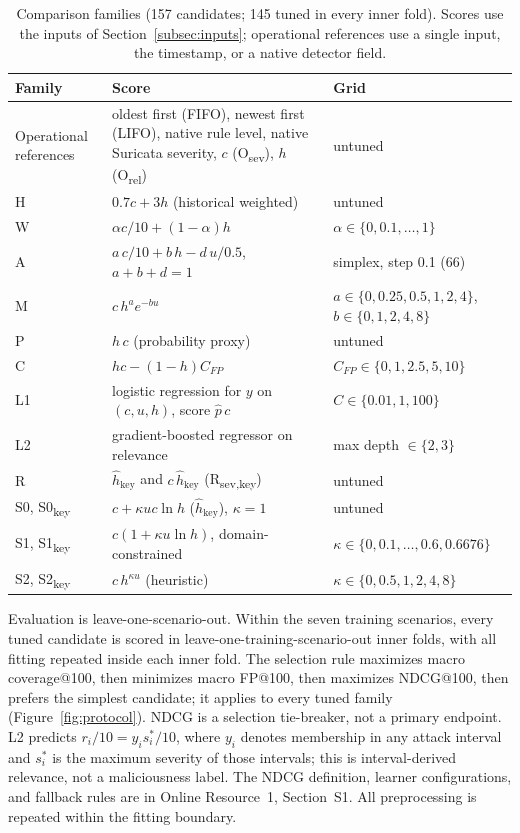\documentclass[pdflatex,sn-basic,Numbered]{sn-jnl}
\newcommand{\NCandidates}{157}
\newcommand{\NTuned}{145}
\newcommand{\key}{\textsubscript{key}}
\newcommand{\Rsev}{R\textsubscript{sev,key}}
\begin{document}
\begin{table}[t]
\caption{Comparison families (\NCandidates{} candidates; \NTuned{} tuned in every inner fold). Scores use the inputs of Section~\ref{subsec:inputs}; operational references use a single input, the timestamp, or a native detector field.}
\label{tab:families}
\small
\setlength{\tabcolsep}{4pt}
\begin{tabular}{>{\raggedright\arraybackslash}p{}>{\raggedright\arraybackslash}p{}>{\raggedright\arraybackslash}p{}}
\toprule
Family & Score & Grid \\
\midrule
Operational references & oldest first (FIFO), newest first (LIFO), native rule level, native Suricata severity, $c$ (O\textsubscript{sev}), $h$ (O\textsubscript{rel}) & untuned \\
H & $0.7c + 3h$ (historical weighted) & untuned \\
W & $\alpha c/10 + (1-\alpha) h$ & $\alpha \in \{0, 0.1, \dots, 1\}$ \\
A & $a\,c/10 + b\,h - d\,u/0.5$, $a+b+d=1$ & simplex, step 0.1 (66) \\
M & $c\,h^{a} e^{-bu}$ & $a \in \{0,0.25,0.5,1,2,4\}$, $b \in \{0,1,2,4,8\}$ \\
P & $h\,c$ (probability proxy) & untuned \\
C & $h c - (1-h) C_{FP}$ & $C_{FP} \in \{0,1,2.5,5,10\}$ \\
L1 & logistic regression for $y$ on $(c,u,h)$, score $\hat p\,c$ & $C \in \{0.01, 1, 100\}$ \\
L2 & gradient-boosted regressor on relevance & max depth $\in \{2,3\}$ \\
R & $\hat h_{\mathrm{key}}$ and $c\,\hat h_{\mathrm{key}}$ (\Rsev) & untuned \\
S0, S0\key & $c + \kappa u c \ln h$ ($\hat h_{\mathrm{key}}$), $\kappa = 1$ & untuned \\
S1, S1\key & $c(1 + \kappa u \ln h)$, domain-constrained & $\kappa \in \{0,0.1,\dots,0.6,0.6676\}$ \\
S2, S2\key & $c\,h^{\kappa u}$ (heuristic) & $\kappa \in \{0,0.5,1,2,4,8\}$ \\
\bottomrule
\end{tabular}
\end{table}

Evaluation is leave-one-scenario-out. Within the seven training scenarios, every tuned candidate is scored in leave-one-training-scenario-out inner folds, with all fitting repeated inside each inner fold. The selection rule maximizes macro coverage@100, then minimizes macro FP@100, then maximizes NDCG@100, then prefers the simplest candidate; it applies to every tuned family (Figure~\ref{fig:protocol}). NDCG is a selection tie-breaker, not a primary endpoint. L2 predicts $r_i/10=y_i s_i^*/10$, where $y_i$ denotes membership in any attack interval and $s_i^*$ is the maximum severity of those intervals; this is interval-derived relevance, not a maliciousness label. The NDCG definition, learner configurations, and fallback rules are in Online Resource~1, Section~S1. All preprocessing is repeated within the fitting boundary.
\end{document}
